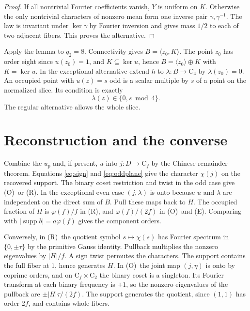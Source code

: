 \documentclass[11pt,letterpaper]{article}
\newcommand{\supp}{\operatorname{supp}}\newcommand{\ord}{\operatorname{ord}}
\newcommand{\Cyc}{\mathrm C}
\newcommand{\rr}{\textup{(R)}}\newcommand{\ooe}{\textup{(O)}}\newcommand{\ee}{\textup{(E)}}
\begin{document}
\begin{proof}
If all nontrivial Fourier coefficients vanish, $Y$ is uniform on $K$. Otherwise the only nontrivial characters of nonzero mean form one inverse pair $\gamma,\gamma^{-1}$. The law is invariant under $\ker\gamma$ by Fourier inversion and gives mass $1/2$ to each of two adjacent fibers. This proves the alternative.
\end{proof}

Apply the lemma to $q_2=8$. Connectivity gives $B=\langle z_0,K\rangle$. The point $z_0$ has order eight since $u(z_0)=1$, and $K\subseteq\ker u$, hence $B=\langle z_0\rangle\oplus K$ with $K=\ker u$. In the exceptional alternative extend $h$ to $\lambda:B\to\Cyc_4$ by $\lambda(z_0)=0$. An occupied point with $u(z)=s$ odd is a scalar multiple by $s$ of a point on the normalized slice. Its condition is exactly
\[
 \lambda(z)\in\{0,s\bmod4\}.
\]
The regular alternative allows the whole slice.

\section{Reconstruction and the converse}
Combine the $u_p$ and, if present, $u$ into $j:D\to\Cyc_f$ by the Chinese remainder theorem. Equations \eqref{eq:sign} and \eqref{eq:oddplane} give the character $\chi(j)$ on the recovered support. The binary coset restriction and twist in the odd case give \ooe\ or \rr. In the exceptional even case $(j,\lambda)$ is onto because $u$ and $\lambda$ are independent on the direct sum of $B$. Pull these maps back to $H$. The occupied fraction of $H$ is $\varphi(f)/f$ in \rr, and $\varphi(f)/(2f)$ in \ooe\ and \ee. Comparing with $|\supp b|=a\varphi(f)$ gives the component orders.

Conversely, in \rr\ the quotient symbol $s\mapsto\chi(s)$ has Fourier spectrum in $\{0,\pm\tau\}$ by the primitive Gauss identity. Pullback multiplies the nonzero eigenvalues by $|H|/f$. A sign twist permutes the characters. The support contains the full fiber at $1$, hence generates $H$. In \ooe\ the joint map $(j,\eta)$ is onto by coprime orders, and on $\Cyc_f\times\Cyc_2$ the binary coset is a singleton. Its Fourier transform at each binary frequency is $\pm1$, so the nonzero eigenvalues of the pullback are $\pm |H|\tau/(2f)$. The support generates the quotient, since $(1,1)$ has order $2f$, and contains whole fibers.
\end{document}
